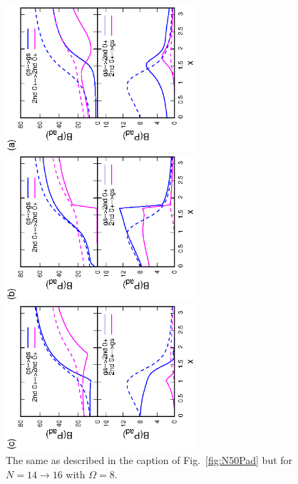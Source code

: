 \documentclass[11pt]{book} %
\begin{document}
\begin{figure}[t]
 \begin{minipage}{0.3\hsize}
 \begin{center}
 \includegraphics[width=70mm,angle=-90]{images/N16Pad_CQ.eps}
 \end{center}
 \captionsetup{labelformat=empty,labelsep=none}
 \end{minipage}
 \begin{minipage}{0.3\hsize}
 \begin{center}
 \includegraphics[width=70mm,angle=-90]{images/N16Pad_FD.eps}
 \end{center}
 \captionsetup{labelformat=empty,labelsep=none}
 \end{minipage}
 \begin{minipage}{0.3\hsize}
 \begin{center}
 \includegraphics[width=70mm,angle=-90]{images/N16Pad_SPA.eps}
 \end{center}
 \captionsetup{labelformat=empty,labelsep=none}
 \end{minipage}
	\caption{The same as described in the caption of Fig.~\ref{fig:N50Pad} but for $N=14\rightarrow 16$
	with $\Omega=8$.
}
 \label{fig:N16Pad}
\end{figure}
\end{document}
